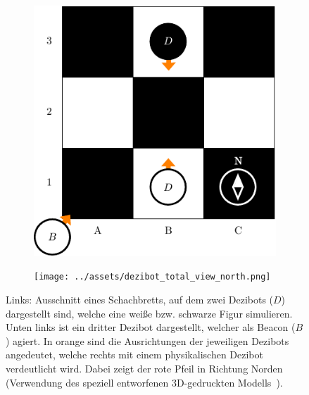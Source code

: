 \begin{figure}[h]
    \centering
    \begin{subfigure}[c]{0.49\textwidth}
        \includegraphics[width=\textwidth]{../assets/usage.drawio.pdf}
    \end{subfigure}
    \hspace{0.5em}
    \begin{subfigure}[c]{0.47\textwidth}
        \texttt{[image: ../assets/dezibot\_total\_view\_north.png]}
    \end{subfigure}
    \caption{Links: Ausschnitt eines Schachbretts, auf dem zwei Dezibots ($D$) dargestellt sind, welche eine weiße bzw. schwarze Figur simulieren. Unten links ist ein dritter Dezibot dargestellt, welcher als Beacon ($B$) agiert. In orange sind die Ausrichtungen der jeweiligen Dezibots angedeutet, welche rechts mit einem physikalischen Dezibot verdeutlicht wird. Dabei zeigt der rote Pfeil in Richtung Norden (Verwendung des speziell entworfenen 3D-gedruckten Modells~\cite[vgl.][]{felttipDezibotAlignmentPointer2025}).}
    \label{fig:usage}
\end{figure}

